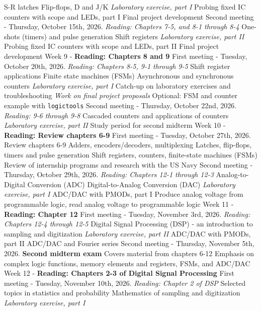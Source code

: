 \documentclass[10pt]{article}
\begin{document}
\begin{outline}[enumerate]
\3 S-R latches
\3 Flip-flops, D and J/K
\3 \textit{Laboratory exercise, part I}
\4 Probing fixed IC counters with scope and LEDs, part I
\4 Final project development
\2 Second meeting - Thursday, October 15th, 2026. \textit{Reading: Chapters 7-5, and 8-1 through 8-4}
\3 One-shots (timers) and pulse generation
\3 Shift registers
\3 \textit{Laboratory exercise, part II}
\4 Probing fixed IC counters with scope and LEDs, part II
\4 Final project development
\1 Week 9 - \textbf{Reading: Chapters 8 and 9}
\2 First meeting - Tuesday, October 20th, 2026. \textit{Reading: Chapters 8-5, 9-1 through 9-5}
\3 Shift register applications
\3 Finite state machines (FSMs)
\3 Asynchronous and synchronous counters
\3 \textit{Laboratory exercise, part I}
\4 Catch-up on laboratory exercises and troubleshooting
\4 \textit{Work on final project proposals}
\4 Optional: FSM and counter example with \verb+logictools+
\2 Second meeting - Thursday, October 22nd, 2026. \textit{Reading: 9-6 through 9-8}
\3 Cascaded counters and applications of counters
\3 \textit{Laboratory exercise, part II}
\4 Study period for second midterm
\1 Week 10 - \textbf{Reading: Review chapters 6-9}
\2 First meeting - Tuesday, October 27th, 2026.
\3 Review chapters 6-9
\4 Adders, encoders/decoders, multiplexing
\4 Latches, flip-flops, timers and pulse generation
\4 Shift registers, counters, finite-state machines (FSMs)
\3 Review of internship programs and research with the US Navy
\2 Second meeting - Thursday, October 29th, 2026. \textit{Reading: Chapters 12-1 through 12-3}
\3 Analog-to-Digital Conversion (ADC)
\3 Digital-to-Analog Conversion (DAC)
\3 \textit{Laboratory exercise, part I}
\4 ADC/DAC with PMODs, part I
\4 Produce analog voltage from programmable logic, read analog voltage to programmable logic
\1 Week 11 - \textbf{Reading: Chapter 12}
\2 First meeting - Tuesday, November 3rd, 2026. \textit{Reading: Chapters 12-4 through 12-5}
\3 Digital Signal Processing (DSP) - an introduction to sampling and digitization
\3 \textit{Laboratory exercise, part II}
\4 ADC/DAC with PMODs, part II
\4 ADC/DAC and Fourier series
\2 Second meeting - Thursday, November 5th, 2026.
\3 \textbf{Second midterm exam}
\4 Covers material from chapters 6-12
\4 Emphasis on complex logic functions, memory elements and registers, FSMs, and ADC/DAC
\1 Week 12 - \textbf{Reading: Chapters 2-3 of Digital Signal Processing}
\2 First meeting - Tuesday, November 10th, 2026. \textit{Reading: Chapter 2 of DSP}
\3 Selected topics in statistics and probability
\3 Mathematics of sampling and digitization
\3 \textit{Laboratory exercise, part I}

\end{outline}
\end{document}
